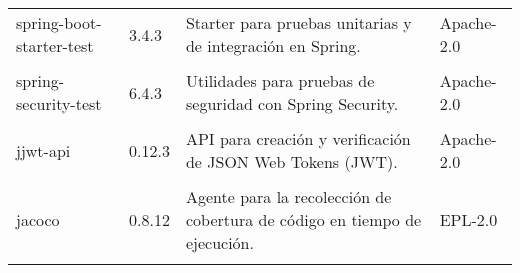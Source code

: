\begin{longtable}[]{@{}p{}p{}p{}p{}@{}}
    \begin{minipage}[t]{0.18\columnwidth}\raggedright spring-boot-starter-test \end{minipage} & \begin{minipage}[t]{0.10\columnwidth}\raggedright 3.4.3 \end{minipage} & \begin{minipage}[t]{0.49\columnwidth}\raggedright Starter para pruebas unitarias y de integración en Spring. \end{minipage} & \begin{minipage}[t]{0.11\columnwidth}\raggedright Apache-2.0 \end{minipage} \\ \tabularnewline

    \begin{minipage}[t]{0.18\columnwidth}\raggedright spring-security-test \end{minipage} & \begin{minipage}[t]{0.10\columnwidth}\raggedright 6.4.3 \end{minipage} & \begin{minipage}[t]{0.49\columnwidth}\raggedright Utilidades para pruebas de seguridad con Spring Security. \end{minipage} & \begin{minipage}[t]{0.11\columnwidth}\raggedright Apache-2.0 \end{minipage} \\ \tabularnewline

    \begin{minipage}[t]{0.18\columnwidth}\raggedright jjwt-api \end{minipage} & \begin{minipage}[t]{0.10\columnwidth}\raggedright 0.12.3 \end{minipage} & \begin{minipage}[t]{0.49\columnwidth}\raggedright API para creación y verificación de JSON Web Tokens (JWT). \end{minipage} & \begin{minipage}[t]{0.11\columnwidth}\raggedright Apache-2.0 \end{minipage} \\ \tabularnewline

    \begin{minipage}[t]{0.18\columnwidth}\raggedright jacoco \end{minipage} & \begin{minipage}[t]{0.10\columnwidth}\raggedright 0.8.12 \end{minipage} & \begin{minipage}[t]{0.49\columnwidth}\raggedright Agente para la recolección de cobertura de código en tiempo de ejecución. \end{minipage} & \begin{minipage}[t]{0.11\columnwidth}\raggedright EPL-2.0 \end{minipage} \\ \tabularnewline


\end{longtable}
